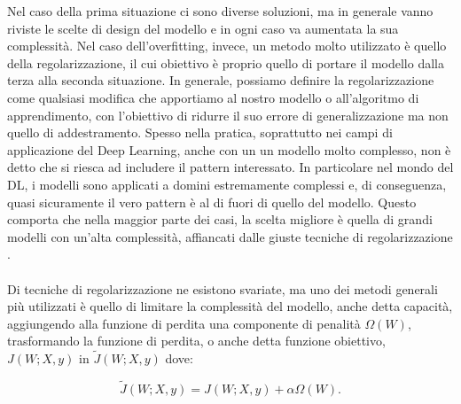 Nel caso della prima situazione ci sono diverse soluzioni, ma in generale vanno riviste le scelte di design del modello e in ogni caso va aumentata la sua complessità. Nel caso dell'overfitting, invece, un metodo molto utilizzato è quello della regolarizzazione, il cui obiettivo è proprio quello di portare il modello dalla terza alla seconda situazione. In generale, possiamo definire la regolarizzazione come qualsiasi modifica che apportiamo al nostro modello o all'algoritmo di apprendimento, con l'obiettivo di ridurre il suo errore di generalizzazione ma non quello di addestramento.
Spesso nella pratica, soprattutto nei campi di applicazione del Deep Learning, anche con un un modello molto complesso, non è detto che si riesca ad includere il pattern interessato. In particolare nel mondo del DL, i modelli sono applicati a domini estremamente complessi e, di conseguenza, quasi sicuramente il vero pattern è al di fuori di quello del modello. Questo comporta che nella maggior parte dei casi, la scelta migliore è quella di grandi modelli con un'alta complessità, affiancati dalle giuste tecniche di regolarizzazione \cite{goodfellow2016deep}.
\\ \\
Di tecniche di regolarizzazione ne esistono svariate, ma uno dei metodi generali più utilizzati è quello di limitare la complessità del modello, anche detta capacità, aggiungendo alla funzione di perdita una componente di penalità $\Omega(W)$, trasformando la funzione di perdita, o anche detta funzione obiettivo, $J(W; X,y)$ in $\tilde{J}(W; X,y)$ dove:

\begin{equation}
    \tilde{J}(W; X,y) = J(W; X,y) + \alpha\Omega(W).
\end{equation}

